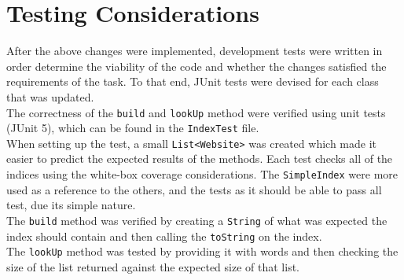 \section{Testing Considerations}
After the above changes were implemented, development tests were written in order determine the viability of the code and whether the changes satisfied the requirements of the task. To that end, JUnit tests were devised for each class that was updated.\\
The correctness of the {\tt build} and {\tt lookUp} method were verified using unit tests (JUnit 5), which can be found in the {\tt IndexTest} file.\\
When setting up the test, a small {\tt List<Website>} was created which made it easier to predict the expected results of the methods. Each test checks all of the indices using the white-box coverage considerations. The {\tt SimpleIndex} were more used as a reference to the others, and the tests as it should be able to pass all test, due its simple nature.\\
The {\tt build} method was verified by creating a {\tt String} of what was expected the index should contain and then calling the {\tt toString} on the index.\\
The {\tt lookUp} method was tested by providing it with words and then checking the size of the list returned against the expected size of that list.



